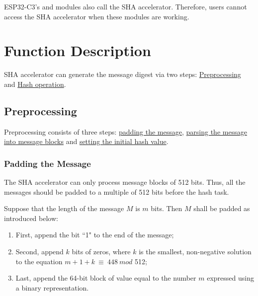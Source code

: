 \documentclass[main\_\_EN.tex]{subfiles}
\begin{document}
\begin{importantlisting}
\vspace{-0.5em}

    ESP32-C3's  and  modules also call the SHA accelerator. Therefore, users cannot access the SHA accelerator when these modules are working.
\end{importantlisting}

\section{Function Description}

SHA accelerator can generate the message digest via two steps: \hyperref[sec:sha-preprocessing]{Preprocessing} and  \hyperref[sec:sha-hash-operation]{Hash operation}.

\subsection{Preprocessing}\label{sec:sha-preprocessing}

Preprocessing consists of three steps: \hyperref[sec:sha-padding-msg]{padding the message}, \hyperref[sec:sha-parsing-msg]{parsing the message into message blocks} and \hyperref[sec:sha-set-initial-hash]{setting the initial hash value}.

\subsubsection{Padding the Message}\label{sec:sha-padding-msg}

The SHA accelerator can only process message blocks of 512 bits. Thus, all the messages should be padded to a multiple of 512 bits before the hash task.

Suppose that the length of the message \begin{math}M\end{math} is \begin{math} m \end{math} bits. Then \begin{math} M \end{math} shall be padded as introduced below:

\begin{enumerate}
    \item First, append the bit ``1" to the end of the message;
    \item Second, append \begin{math} k \end{math} bits of zeros, where \begin{math} k \end{math} is the smallest, non-negative solution to the equation \begin{math}m + 1 + k \ {\equiv} \ 448 \ mod \end{math} 512;
    \item Last, append the 64-bit block of value equal to the number \begin{math} m \end{math} expressed using a binary representation.
\end{enumerate}
\end{document}
